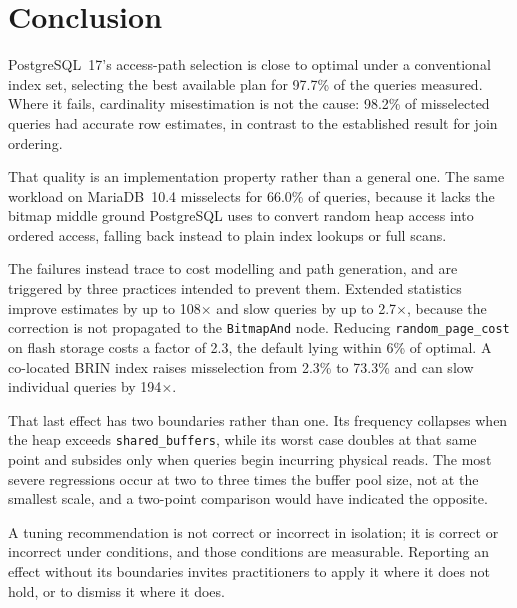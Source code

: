 \documentclass[preprint,12pt,authoryear]{elsarticle}
\newcommand{\rpc}{\texttt{random\_page\_cost}}
\newcommand{\sbuf}{\texttt{shared\_buffers}}
\begin{document}
\section{Conclusion}
\label{sec:conclusion}

PostgreSQL~17's access-path selection is close to optimal under a
conventional index set, selecting the best available plan for 97.7\% of
the queries measured. Where it fails, cardinality misestimation is not
the cause: 98.2\% of misselected queries had accurate row estimates, in
contrast to the established result for join ordering.

That quality is an implementation property rather than a general one.
The same workload on MariaDB~10.4 misselects for 66.0\% of queries,
because it lacks the bitmap middle ground PostgreSQL uses to convert
random heap access into ordered access, falling back instead to plain
index lookups or full scans.

The failures instead trace to cost modelling and path generation, and
are triggered by three practices intended to prevent them. Extended
statistics improve estimates by up to 108$\times$ and slow queries by
up to 2.7$\times$, because the correction is not propagated to the
\texttt{BitmapAnd} node. Reducing \rpc{} on flash storage costs a
factor of 2.3, the default lying within 6\% of optimal. A co-located
BRIN index raises misselection from 2.3\% to 73.3\% and can slow
individual queries by 194$\times$.

That last effect has two boundaries rather than one. Its frequency
collapses when the heap exceeds \sbuf{}, while its worst case doubles
at that same point and subsides only when queries begin incurring
physical reads. The most severe regressions occur at two to three times
the buffer pool size, not at the smallest scale, and a two-point
comparison would have indicated the opposite.

A tuning recommendation is not correct or incorrect in isolation; it is
correct or incorrect under conditions, and those conditions are
measurable. Reporting an effect without its boundaries invites
practitioners to apply it where it does not hold, or to dismiss it
where it does.
\end{document}
